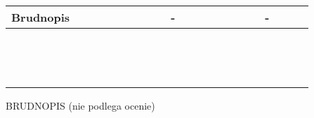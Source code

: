 \documentclass[10pt]{article}
\begin{document}
\begin{center}
\begin{tabular}{|c|c|c|c|c|c|c|c|c|c|c|c|c|c|c|c|c|c|c|c|c|c|c|c|}
\hline
\multicolumn{4}{|l|}{Brudnopis} &  &  &  &  &  &  &  &  & - &  &  &  &  &  &  &  & - &  &  &  \\
\hline
 &  &  &  &  &  &  &  &  &  &  &  &  &  &  &  &  &  &  &  &  &  &  &  \\
\hline
 &  &  &  &  &  &  &  &  &  &  &  &  &  &  &  &  &  &  &  &  &  &  &  \\
\hline
 &  &  &  &  &  &  &  &  &  &  &  &  &  &  &  &  &  &  &  &  &  &  &  \\
\hline
 &  &  &  &  &  &  &  &  &  &  &  &  &  &  &  &  &  &  &  &  &  &  &  \\
\hline
 &  &  &  &  &  &  &  &  &  &  &  &  &  &  &  &  &  &  &  &  &  &  &  \\
\hline
 &  &  &  &  &  &  &  &  &  &  &  &  &  &  &  &  &  &  &  &  &  &  &  \\
\hline
 &  &  &  &  &  &  &  &  &  &  &  &  &  &  &  &  &  &  &  &  &  &  &  \\
\hline
 &  &  &  &  &  &  &  &  &  &  &  &  &  &  &  &  &  &  &  &  &  &  &  \\
\hline
 &  &  &  &  &  &  &  &  &  &  &  &  &  &  &  &  &  &  &  &  &  &  &  \\
\hline
 &  &  &  &  &  &  &  &  &  &  &  &  &  &  &  &  &  &  &  &  &  &  &  \\
\hline
 &  &  &  &  &  &  &  &  &  &  &  &  &  &  &  &  &  &  &  &  &  &  &  \\
\hline
 &  &  &  &  &  &  &  &  &  &  &  &  &  &  &  &  &  &  &  &  &  &  &  \\
\hline
 &  &  &  &  &  &  &  &  &  &  &  &  &  &  &  &  &  &  &  &  &  &  &  \\
\hline
 &  &  &  &  &  &  &  &  &  &  &  &  &  &  &  &  &  &  &  &  &  &  &  \\
\hline
\end{tabular}
\end{center}

BRUDNOPIS (nie podlega ocenie)
\end{document}

